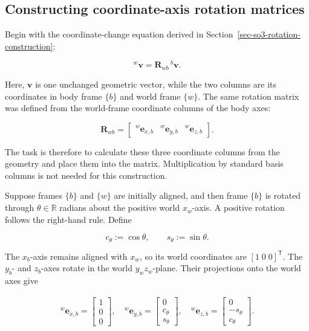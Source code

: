 \documentclass[
  australian,
  12pt,
  letterpaper,
  DIV=11,
  numbers=noendperiod,
  twoside]{scrreprt}
\begin{document}
\subsection{Constructing coordinate-axis rotation
matrices}\label{sec-so3-active-axis-rotations}

Begin with the coordinate-change equation derived in
Section~\ref{sec-so3-rotation-construction}:

\[
\boxed{
{}^{w}\mathbf v
=
\mathbf R_{wb}\,{}^{b}\mathbf v
}.
\]

Here, \(\mathbf v\) is one unchanged geometric vector, while the two
columns are its coordinates in body frame \(\{b\}\) and world frame
\(\{w\}\). The same rotation matrix was defined from the world-frame
coordinate columns of the body axes:

\[
\boxed{
\mathbf R_{wb}
=
\begin{bmatrix}
{}^{w}\mathbf e_{x,b}&
{}^{w}\mathbf e_{y,b}&
{}^{w}\mathbf e_{z,b}
\end{bmatrix}
}.
\]

The task is therefore to calculate these three coordinate columns from
the geometry and place them into the matrix. Multiplication by standard
basis columns is not needed for this construction.

Suppose frames \(\{b\}\) and \(\{w\}\) are initially aligned, and then
frame \(\{b\}\) is rotated through \(\theta\in\mathbb R\) radians about
the positive world \(x_w\)-axis. A positive rotation follows the
right-hand rule. Define

\[
c_\theta\mathrel{:=}\cos\theta,
\qquad
s_\theta\mathrel{:=}\sin\theta.
\]

The \(x_b\)-axis remains aligned with \(x_w\), so its world coordinates
are \([1\;0\;0]^\mathsf T\). The \(y_b\)- and \(z_b\)-axes rotate in the
world \(y_wz_w\)-plane. Their projections onto the world axes give

\[
\begin{aligned}
{}^{w}\mathbf e_{x,b}
=
\begin{bmatrix}
1\\0\\0
\end{bmatrix}, \quad
{}^{w}\mathbf e_{y,b}
=
\begin{bmatrix}
0\\c_\theta\\s_\theta
\end{bmatrix}, \quad
{}^{w}\mathbf e_{z,b}
=
\begin{bmatrix}
0\\-s_\theta\\c_\theta
\end{bmatrix}.
\end{aligned}
\]
\end{document}
